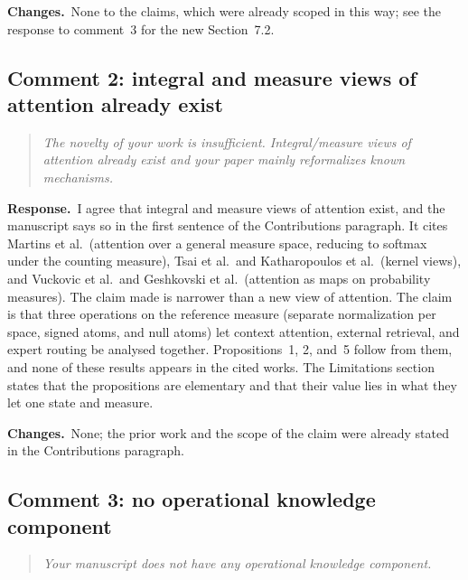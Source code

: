 \documentclass[11pt]{article}
\newenvironment{reviewer}{\par\medskip\noindent\begin{quote}\itshape}{\end{quote}}
\newcommand{\response}{\par\noindent\textbf{Response.}\ }
\newcommand{\changes}{\par\smallskip\noindent\textbf{Changes.}\ }
\begin{document}
\changes None to the claims, which were already scoped in this way; see the response to comment~3 for the new Section~7.2.

\subsection*{Comment 2: integral and measure views of attention already exist}

\begin{reviewer}
The novelty of your work is insufficient. Integral/measure views of attention already exist and your paper mainly reformalizes known mechanisms.
\end{reviewer}

\response I agree that integral and measure views of attention exist, and the manuscript says so in the first sentence of the Contributions paragraph. It cites Martins et al.\ (attention over a general measure space, reducing to softmax under the counting measure), Tsai et al.\ and Katharopoulos et al.\ (kernel views), and Vuckovic et al.\ and Geshkovski et al.\ (attention as maps on probability measures). The claim made is narrower than a new view of attention. The claim is that three operations on the reference measure (separate normalization per space, signed atoms, and null atoms) let context attention, external retrieval, and expert routing be analysed together. Propositions~1, 2, and~5 follow from them, and none of these results appears in the cited works. The Limitations section states that the propositions are elementary and that their value lies in what they let one state and measure.

\changes None; the prior work and the scope of the claim were already stated in the Contributions paragraph.

\subsection*{Comment 3: no operational knowledge component}

\begin{reviewer}
Your manuscript does not have any operational knowledge component.
\end{reviewer}
\end{document}
